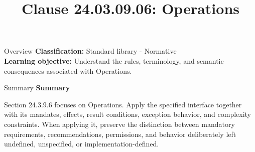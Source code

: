 \documentclass[10pt,letterpaper]{article}
\title{Clause 24.03.09.06: Operations}
\author{}
\date{}
\begin{document}
\maketitle
\begin{CornellOverviewBox}{Overview}
\textbf{Classification:} Standard library - Normative\\[2pt]
\textbf{Learning objective:} Understand the rules, terminology, and semantic consequences associated with Operations.
\end{CornellOverviewBox}\begin{CornellSummaryBox}{Summary}
{\sffamily\bfseries\color{Accent} Summary}\par\vspace{3pt}Section 24.3.9.6 focuses on Operations. Apply the specified interface together with its mandates, effects, result conditions, exception behavior, and complexity constraints. When applying it, preserve the distinction between mandatory requirements, recommendations, permissions, and behavior deliberately left undefined, unspecified, or implementation-defined.
\end{CornellSummaryBox}
\end{document}
